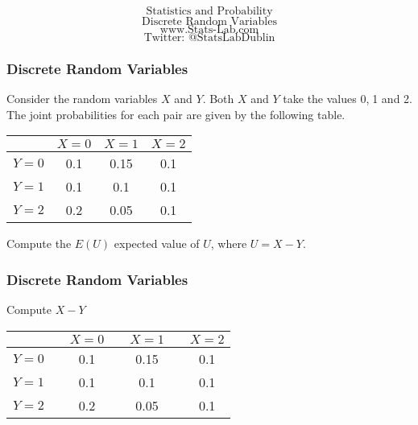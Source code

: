 \documentclass{beamer}
\begin{document}
\begin{frame}
\Huge
\[ \mbox{Statistics and Probability} \]
\LARGE
\[ \mbox{Discrete Random Variables} \]
\bigskip
\Large
\[ \mbox{www.Stats-Lab.com} \]
\[ \mbox{Twitter: @StatsLabDublin} \]
\bigskip

\end{frame}
\begin{frame}
\frametitle{Discrete Random Variables}
\Large
Consider the random variables $X$ and $Y$. Both $X$ and $Y$ take the values 0,$\;$1 and 2. 
The joint probabilities for each pair are given by the following table.
\begin{center}
\begin{tabular}{|c|c|c|c|}
\hline  & $X=0$ & $X=1$ & $X=2$ \\ 
\hline $Y=0$ & 0.1 & 0.15 & 0.1 \\ 
\hline $Y=1$ & 0.1 & 0.1 & 0.1 \\ 
\hline $Y=2$ & 0.2 & 0.05 & 0.1 \\ 
\hline 
\end{tabular} 
\end{center}
Compute the $E(U)$ expected value of $U$, where $U=X-Y$.

\end{frame}
\begin{frame}
\frametitle{Discrete Random Variables}
\Large
Compute $X-Y$
\begin{center}
\begin{tabular}{|c|cc|cc|cc|}
\hline  & \phantom{space}&$X=0$ &\phantom{space} & $X=1$ & \phantom{space}& $X=2$ \\ 
\hline $Y=0$& & 0.1 & & 0.15 & & 0.1 \\ 
\hline $Y=1$& & 0.1 & & 0.1 & & 0.1 \\ 
\hline $Y=2$& & 0.2 & & 0.05 & & 0.1 \\ 
\hline 
\end{tabular} 
\end{center}
\end{frame}
\end{document}
